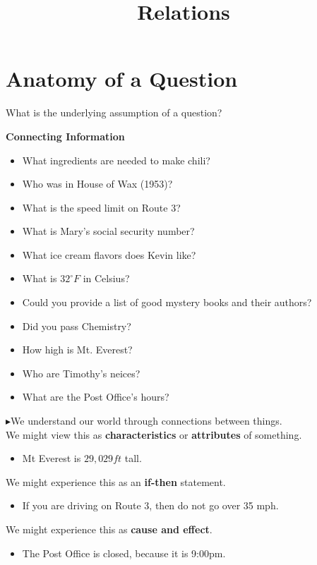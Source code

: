 \documentclass{ximera}
\title{Relations}
\begin{document}
\begin{abstract}

\end{abstract}
\maketitle



\section{Anatomy of a Question}


What is the underlying assumption of a question?


\begin{observation} \textbf{\textcolor{blue!75!black}{Connecting Information}}  

\begin{itemize} 
\item What ingredients are needed to make chili?
\item Who was in House of Wax (1953)?
\item What is the speed limit on Route 3?
\item What is Mary's social security number?
\item What ice cream flavors does Kevin like?
\item What is $32^\circ F$ in Celsius?
\item Could you provide a list of good mystery books and their authors?
\item Did you pass Chemistry?
\item How high is Mt. Everest?
\item Who are Timothy's neices?
\item What are the Post Office's hours?
\end{itemize}

$\blacktriangleright$We understand our world through connections between things. \\


We might view this as \textbf{\textcolor{purple!85!blue}{characteristics}} or \textbf{\textcolor{purple!85!blue}{attributes}} of something. 
\begin{itemize}
\item Mt Everest is $29,029 ft$ tall.
\end{itemize}


We might experience this as an \textbf{\textcolor{purple!85!blue}{if-then}} statement.
\begin{itemize}
\item If you are driving on Route 3, then do not go over 35 mph.
\end{itemize}



We might experience this as \textbf{\textcolor{purple!85!blue}{cause and effect}}.
\begin{itemize}
\item The Post Office is closed, because it is 9:00pm.
\end{itemize}

\end{observation}
\end{document}
